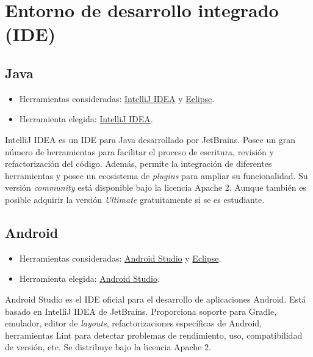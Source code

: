 \section{Entorno de desarrollo integrado
(IDE)}\label{entorno-de-desarrollo-integrado-ide}

\subsection{Java}\label{java}

\begin{itemize}
\tightlist
\item
  Herramientas consideradas:
  \href{https://www.jetbrains.com/idea/}{IntelliJ IDEA} y
  \href{https://eclipse.org/}{Eclipse}.
\item
  Herramienta elegida: \href{https://www.jetbrains.com/idea/}{IntelliJ
  IDEA}.
\end{itemize}

IntelliJ IDEA es un IDE para Java desarrollado por JetBrains. Posee un
gran número de herramientas para facilitar el proceso de escritura,
revisión y refactorización del código. Además, permite la integración de
diferentes herramientas y posee un ecosistema de \emph{plugins} para
ampliar su funcionalidad. Su versión \emph{community} está disponible
bajo la licencia Apache 2. Aunque también es posible adquirir la versión
\emph{Ultimate} gratuitamente si se es estudiante.

\subsection{Android}\label{android}

\begin{itemize}
\tightlist
\item
  Herramientas consideradas:
  \href{https://developer.android.com/studio/index.html}{Android Studio}
  y \href{https://eclipse.org/}{Eclipse}.
\item
  Herramienta elegida:
  \href{https://developer.android.com/studio/index.html}{Android
  Studio}.
\end{itemize}

Android Studio es el IDE oficial para el desarrollo de aplicaciones
Android. Está basado en IntelliJ IDEA de JetBrains. Proporciona soporte
para Gradle, emulador, editor de \emph{layouts}, refactorizaciones
específicas de Android, herramientas Lint para detectar problemas de
rendimiento, uso, compatibilidad de versión, etc. Se distribuye bajo la
licencia Apache 2.

